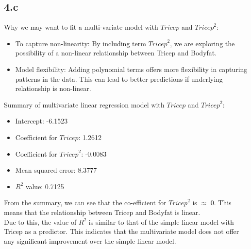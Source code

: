 \documentclass[12pt]{article}
\begin{document}
\subsection*{4.c}
Why we may want to fit a multi-variate model with \(Tricep\) and \({Tricep}^2\):
\begin{itemize}
    \item To capture non-linearity: By including term \({Tricep}^2\), we are
    exploring the possibility of a non-linear relationship between Tricep and
    Bodyfat.
    \item Model flexibility: Adding polynomial terms offers more flexibility
    in capturing patterns in the data. This can lead to better predictions if
    underlying relationship is non-linear.
\end{itemize}
Summary of multivariate linear regression model with \(Tricep\) and \({Tricep}^2\):
\begin{itemize}
    \item Intercept: -6.1523
    \item Coefficient for \(Tricep\): 1.2612
    \item Coefficient for \({Tricep}^2\): -0.0083
    \item Mean squared error: 8.3777
    \item \(R^2\) value: 0.7125
\end{itemize}
From the summary, we can see that the co-efficient for \({Tricep}^2\) is
\(\approx\) 0. This means that the relationship between Tricep and Bodyfat is
linear.
\\
Due to this, the value of \(R^2\) is similar to that of the simple linear model
with Tricep as a predictor. This indicates that the multivariate model does not
offer any significant improvement over the simple linear model.

\newpage
\end{document}
